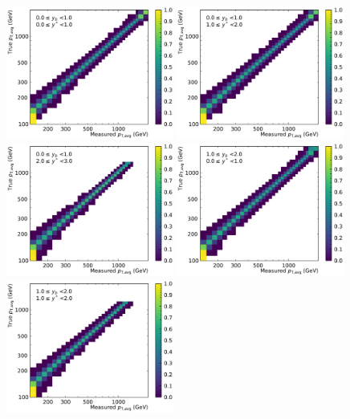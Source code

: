\begin{figure}[htp]
    \centering
    \includegraphics[width=0.49\textwidth]{figures/measurement/res_matrix_ptavg_normalized_yb0ys0.pdf}\hfill
    \includegraphics[width=0.49\textwidth]{figures/measurement/res_matrix_ptavg_normalized_yb0ys1.pdf}
    \includegraphics[width=0.49\textwidth]{figures/measurement/res_matrix_ptavg_normalized_yb0ys2.pdf}\hfill
    \includegraphics[width=0.49\textwidth]{figures/measurement/res_matrix_ptavg_normalized_yb1ys0.pdf}
    \includegraphics[width=0.49\textwidth]{figures/measurement/res_matrix_ptavg_normalized_yb1ys1.pdf}\hfill

\end{figure}

